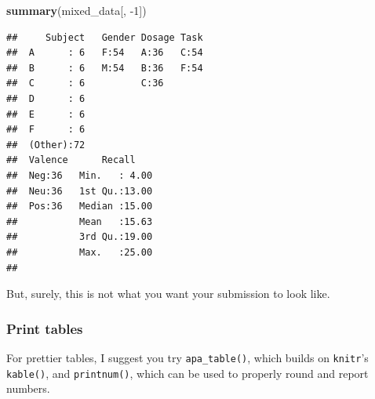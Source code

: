 \documentclass[english,man,floatsintext]{apa6}
\newenvironment{Shaded}{\begin{snugshade}}{\end{snugshade}}
\newcommand{\DataTypeTok}[1]{\textcolor[rgb]{0.13,0.29,0.53}{#1}}
\newcommand{\DecValTok}[1]{\textcolor[rgb]{0.00,0.00,0.81}{#1}}
\newcommand{\KeywordTok}[1]{\textcolor[rgb]{0.13,0.29,0.53}{\textbf{#1}}}
\newcommand{\NormalTok}[1]{#1}
\newcommand{\OperatorTok}[1]{\textcolor[rgb]{0.81,0.36,0.00}{\textbf{#1}}}
\newcommand{\StringTok}[1]{\textcolor[rgb]{0.31,0.60,0.02}{#1}}
\begin{document}
\begin{Shaded}
\begin{Highlighting}[]
\KeywordTok{summary}\NormalTok{(mixed_data[, }\DecValTok{-1}\NormalTok{])}
\end{Highlighting}
\end{Shaded}

\begin{verbatim}
##     Subject   Gender Dosage Task  
##  A      : 6   F:54   A:36   C:54  
##  B      : 6   M:54   B:36   F:54  
##  C      : 6          C:36         
##  D      : 6                       
##  E      : 6                       
##  F      : 6                       
##  (Other):72                       
##  Valence      Recall     
##  Neg:36   Min.   : 4.00  
##  Neu:36   1st Qu.:13.00  
##  Pos:36   Median :15.00  
##           Mean   :15.63  
##           3rd Qu.:19.00  
##           Max.   :25.00  
## 
\end{verbatim}

But, surely, this is not what you want your submission to look like.

\hypertarget{print-tables}{%
\subsubsection{Print tables}\label{print-tables}}

For prettier tables, I suggest you try \texttt{apa\_table()}, which builds on \texttt{knitr}'s \texttt{kable()}, and \texttt{printnum()}, which can be used to properly round and report numbers.





\begin{Shaded}
\end{Shaded}
\end{document}
